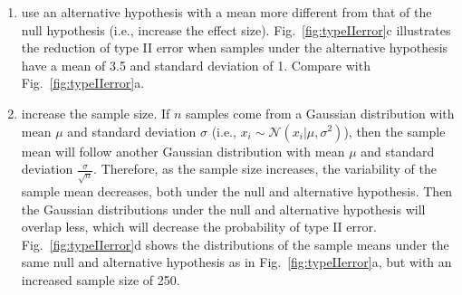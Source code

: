 \documentclass[12pt]{article}
\begin{document}
\begin{enumerate}[(a)]
\begin{enumerate}[1.]
            \item use an alternative hypothesis with a mean more different from
                that of the null hypothesis (i.e., increase the effect size).
                Fig.~\ref{fig:typeIIerror}c
                illustrates the reduction of type II error when samples under
                the alternative hypothesis have a mean of 3.5 and standard
                deviation of 1. Compare with
                Fig.~\ref{fig:typeIIerror}a.

            \item increase the sample size. If $n$ samples come from a Gaussian
                distribution with mean $\mu$ and standard deviation $\sigma$
                (i.e., $x_i\sim\mathcal{N}(x_i|\mu,\sigma^2)$), then the sample
                mean will follow another Gaussian distribution with mean $\mu$
                and standard deviation $\frac{\sigma}{\sqrt{n}}$. Therefore, as
                the sample size increases, the variability of the sample mean
                decreases, both under the null and alternative hypothesis. Then
                the Gaussian distributions under the null and alternative
                hypothesis will overlap less, which will decrease the
                probability of type II error.
                Fig.~\ref{fig:typeIIerror}d shows
                the distributions of the sample means under the same null
                and alternative hypothesis as in 
                Fig.~\ref{fig:typeIIerror}a, but
                with an increased sample size of 250.
        \end{enumerate}
    

\end{enumerate}
\end{document}
